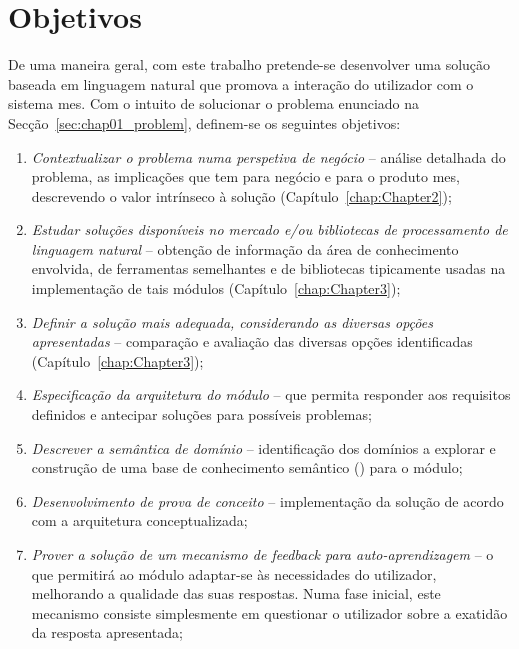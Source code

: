 \section{Objetivos}
\label{sec:chap01_objectives}
De uma maneira geral, com este trabalho pretende-se desenvolver uma solução baseada em linguagem natural que promova a interação do utilizador com o sistema \gls{mes}. Com o intuito de solucionar o problema enunciado na Secção~\ref{sec:chap01_problem}, definem-se os seguintes objetivos:

\begin{enumerate}
    \item
    \label{enum:chap01_objectives_1}
    {
        \textit{Contextualizar o problema numa perspetiva de negócio} -- análise detalhada do problema, as implicações que tem para negócio e para o produto \gls{mes}, descrevendo o valor intrínseco à solução (Capítulo~\ref{chap:Chapter2});
    }
    \item
    \label{enum:chap01_objectives_2}
    {
        \textit{Estudar soluções disponíveis no mercado e/ou bibliotecas de processamento de linguagem natural} -- obtenção de informação da área de conhecimento envolvida, de ferramentas semelhantes e de bibliotecas tipicamente usadas na implementação de tais módulos (Capítulo~\ref{chap:Chapter3});
    }
    \item
    \label{enum:chap01_objectives_3}
    {
        \textit{Definir a solução mais adequada, considerando as diversas opções apresentadas} -- comparação e avaliação das diversas opções identificadas (Capítulo~\ref{chap:Chapter3});
    }
    \item
    \label{enum:chap01_objectives_4}
    {
        \textit{Especificação da arquitetura do módulo} -- que permita responder aos requisitos definidos e antecipar soluções para possíveis problemas;
    }
    \item
    \label{enum:chap01_objectives_5}
    {
        \textit{Descrever a semântica de domínio} -- identificação dos domínios a explorar e construção de uma base de conhecimento semântico () para o módulo;
    }
    \item
    \label{enum:chap01_objectives_6}
    {
        \textit{Desenvolvimento de prova de conceito} -- implementação da solução de acordo com a arquitetura conceptualizada;
    }
    \item
    \label{enum:chap01_objectives_7}
    {
        \textit{Prover a solução de um mecanismo de feedback para auto-aprendizagem} -- o que permitirá ao módulo adaptar-se às necessidades do utilizador, melhorando a qualidade das suas respostas. Numa fase inicial, este mecanismo consiste simplesmente em questionar o utilizador sobre a exatidão da resposta apresentada;
    }
    

\end{enumerate}
